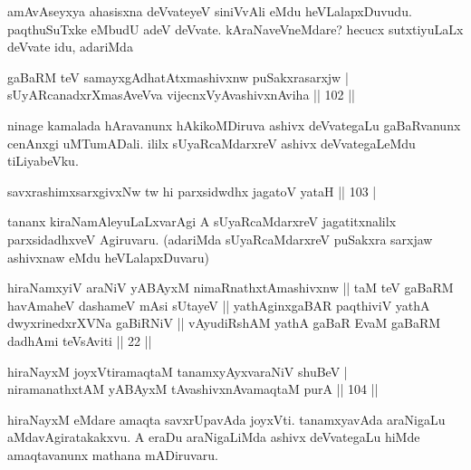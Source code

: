 \begin{artha}
amAvAseyxya ahasisxna deVvateyeV siniVvAli eMdu heVLalapxDuvudu. 
paqthuSuTxke eMbudU adeV deVvate. kAraNaveVneMdare? hecucx 
sutxtiyuLaLx deVvate idu, adariMda
\end{artha}

\begin{shl}
gaBaRM teV samayxgAdhatAtxmashivxnw puSakxrasarxjw | \\
sUyARcanadxrXmasAveVva vijecnxVyAvashivxnAviha \hfill|| 102 || 
\end{shl}

\begin{artha}
ninage kamalada hAravanunx hAkikoMDiruva ashivx deVvategaLu 
gaBaRvanunx cenAnxgi uMTumADali. ililx sUyaRcaMdarxreV ashivx 
deVvategaLeMdu tiLiyabeVku.
\end{artha}


\begin{shl}
savxrashimxsarxgivxNw tw hi parxsidwdhx jagatoV yataH \hfill|| 103 | \\
\end{shl}

\begin{artha}
tananx kiraNamAleyuLaLxvarAgi A sUyaRcaMdarxreV jagatitxnalilx 
parxsidadhxveV Agiruvaru. (adariMda sUyaRcaMdarxreV puSakxra sarxjaw 
ashivxnaw eMdu heVLalapxDuvaru)
\end{artha}

\begin{shl}
hiraNamxyiV araNiV yABAyxM nimaRnathxtAmashivxnw || taM teV gaBaRM havAmaheV dashameV mAsi sUtayeV || yathAginxgaBAR paqthiviV yathA dwyxrinedxrXVNa gaBiRNiV || vAyudiRshAM yathA gaBaR EvaM gaBaRM dadhAmi teV\s sAviti || 22 ||
\end{shl}
 

\begin{shl}
hiraNayxM joyxVtiramaqtaM tanamxyAyxvaraNiV shuBeV | \\
niramanathxtAM yABAyxM tAvashivxnAvamaqtaM purA \hfill|| 104 || 
\end{shl}

\begin{artha}
hiraNayxM eMdare amaqta savxrUpavAda joyxVti. tanamxyavAda araNigaLu 
aMdavAgiratakakxvu. A eraDu araNigaLiMda ashivx deVvategaLu hiMde 
amaqtavanunx mathana mADiruvaru.
\end{artha}

